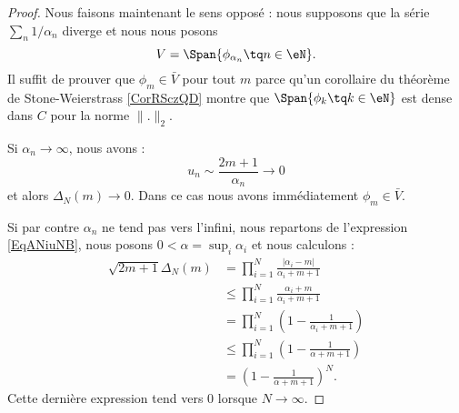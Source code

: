\begin{proof}
    Nous faisons maintenant le sens opposé : nous supposons que la série \( \sum_n1/\alpha_n\) diverge et nous nous posons
    \begin{equation}
        V=\Span\{ \phi_{\alpha_n}\tq n\in \eN \}.
    \end{equation}
    Il suffit de prouver que \( \phi_m\in \bar V\) pour tout \( m\) parce qu'un corollaire du théorème de Stone-Weierstrass \ref{CorRSczQD} montre que \( \Span\{ \phi_k\tq k\in \eN \}\) est dense dans \( C\) pour la norme \( \| . \|_2\). 
    
    Si \( \alpha_n\to \infty\), nous avons :
    \begin{equation}
        u_n\sim\frac{ 2m+1 }{ \alpha_n }\to 0
    \end{equation}
    et alors \( \Delta_N(m)\to 0\). Dans ce cas nous avons immédiatement \( \phi_m\in \bar V\).

    Si par contre \( \alpha_n\) ne tend pas vers l'infini, nous repartons de l'expression \eqref{EqANiuNB}, nous posons \( 0<\alpha=\sup_i\alpha_i\) et nous calculons :
    \begin{subequations}
        \begin{align}
            \sqrt{2m+1}\Delta_N(m)&=\prod_{i=1}^N\frac{ | \alpha_i-m | }{ \alpha_i+m+1 }\\
            &\leq \prod_{i=1}^N\frac{ \alpha_i+m }{ \alpha_i+m+1 }\\
            &=\prod_{i=1}^N\left( 1-\frac{ 1 }{ \alpha_i+m+1 } \right)\\
            &\leq \prod_{i=1}^N\left( 1-\frac{1}{ \alpha+m+1 } \right)\\
            &=\left( 1-\frac{1}{ \alpha+m+1 } \right)^N.
        \end{align}
    \end{subequations}
    Cette dernière expression tend vers \( 0\) lorsque \( N\to \infty\).
\end{proof}

